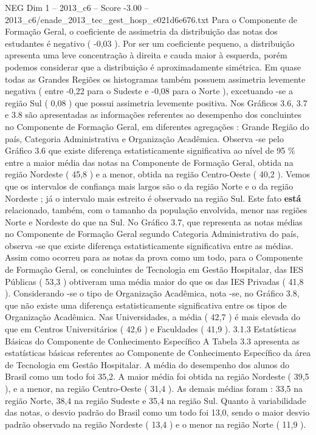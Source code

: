 \begin{textsample}{NEG Dim 1 – 2013\_c6 – Score -3.00 – 2013\_c6/enade\_2013\_tec\_gest\_hosp\_e021d6e676.txt}
Para o Componente de Formação Geral, o coeficiente de assimetria da distribuição das notas dos estudantes é negativo ( -0,03 ).
Por ser um coeficiente pequeno, a distribuição apresenta uma leve concentração à direita e cauda maior à esquerda, porém podemos considerar que a distribuição é aproximadamente simétrica.
Em quase todas as Grandes Regiões os histogramas também possuem assimetria levemente negativa ( entre -0,22 para o Sudeste e -0,08 para o Norte ), excetuando -se a região Sul ( 0,08 ) que possui assimetria levemente positiva.
Nos Gráficos 3.6, 3.7 e 3.8 são apresentadas as informações referentes ao desempenho dos concluintes no Componente de Formação Geral, em diferentes agregações : Grande Região do país, Categoria Administrativa e Organização Acadêmica.
Observa -se pelo Gráfico 3.6 que existe diferença estatisticamente significativa ao nível de 95 \% entre a maior média das notas na Componente de Formação Geral, obtida na região Nordeste ( 45,8 ) e a menor, obtida na região Centro-Oeste ( 40,2 ).
Vemos que os intervalos de confiança mais largos são o da região Norte e o da região Nordeste ; já o intervalo mais estreito é observado na região Sul.
Este fato \textbf{está} relacionado, também, com o tamanho da população envolvida, menor nas regiões Norte e Nordeste do que na Sul.
No Gráfico 3.7, que representa as notas médias no Componente de Formação Geral segundo Categoria Administrativa do país, observa -se que existe diferença estatisticamente significativa entre as médias.
Assim como ocorreu para as notas da prova como um todo, para o Componente de Formação Geral, os concluintes de Tecnologia em Gestão Hospitalar, das IES Públicas ( 53,3 ) obtiveram uma média maior do que os das IES Privadas ( 41,8 ).
Considerando -se o tipo de Organização Acadêmica, nota -se, no Gráfico 3.8, que não existe uma diferença estatisticamente significativa entre os tipos de Organização Acadêmica.
Nas Universidades, a média ( 42,7 ) é mais elevada do que em Centros Universitários ( 42,6 ) e Faculdades ( 41,9 ). 3.1.3 Estatísticas Básicas do Componente de Conhecimento Específico A Tabela 3.3 apresenta as estatísticas básicas referentes ao Componente de Conhecimento Específico da área de Tecnologia em Gestão Hospitalar.
A média do desempenho dos alunos do Brasil como um todo foi 35,2.
A maior média foi obtida na região Nordeste ( 39,5 ), e a menor, na região Centro-Oeste ( 31,4 ).
As demais médias foram : 33,5 na região Norte, 38,4 na região Sudeste e 35,4 na região Sul.
Quanto à variabilidade das notas, o desvio padrão do Brasil como um todo foi 13,0, sendo o maior desvio padrão observado na região Nordeste ( 13,4 ) e o menor na região Norte ( 11,9 ).

\end{textsample}
